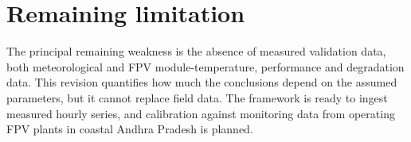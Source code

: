 \documentclass[11pt]{article}
\begin{document}
\section*{Remaining limitation}
The principal remaining weakness is the absence of measured validation data, both meteorological and FPV
module-temperature, performance and degradation data. This revision quantifies how much the conclusions depend on the
assumed parameters, but it cannot replace field data. The framework is ready to ingest measured hourly series, and
calibration against monitoring data from operating FPV plants in coastal Andhra Pradesh is planned.
\end{document}
